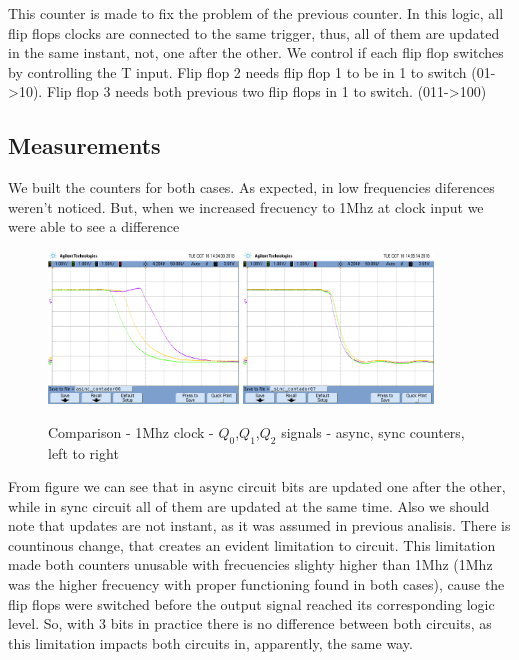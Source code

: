 This counter is made to fix the problem of the previous counter. In this logic, all flip flops clocks are connected to the same trigger, thus, all of them are updated in the same instant, not, one after the other. We control if each flip flop switches by controlling the T input. Flip flop 2 needs flip flop 1 to be in 1 to switch (01->10). Flip flop 3 needs both previous two flip flops in 1 to switch. (011->100)

\subsection*{Measurements}

We built the counters for both cases. As expected, in low frequencies diferences weren't noticed. But, when we increased frecuency to 1Mhz at clock input we were able to see a difference

\begin{figure}[H]
    \begin{centering}
    \includegraphics[width=0.45\textwidth]{data/asinc_contador06.png}
    \includegraphics[width=0.45\textwidth]{data/_sinc_contador07.png}
    \par\end{centering}
    \caption{Comparison - 1Mhz clock - $Q_0$,$Q_1$,$Q_2$ signals - async, sync counters, left to right}
\end{figure}

From figure we can see that in async circuit bits are updated one after the other, while in sync circuit all of them are updated at the same time.
Also we should note that updates are not instant, as it was assumed in previous analisis. There is countinous change, that creates an evident limitation to circuit.
This limitation made both counters unusable with frecuencies slighty higher than 1Mhz (1Mhz was the higher frecuency with proper functioning found in both cases), cause the flip flops were switched before the output signal reached its corresponding logic level.
So, with 3 bits in practice there is no difference between both circuits, as this limitation impacts both circuits in, apparently, the same way.

